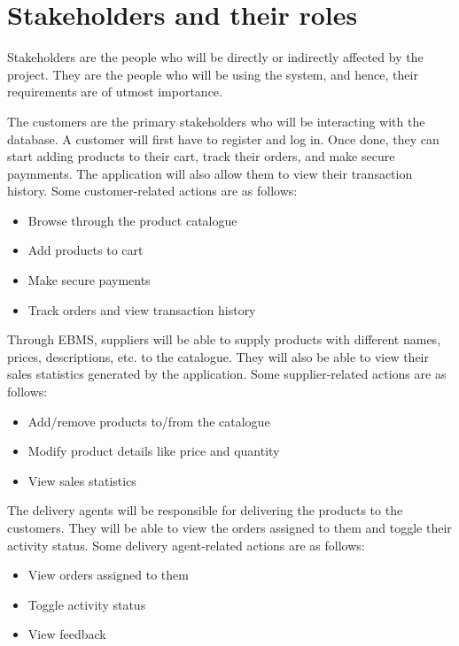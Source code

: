 \section{Stakeholders and their roles}

Stakeholders are the people who will be directly or indirectly affected by the project.
They are the people who will be using the system, and hence, their requirements are of utmost importance.

\begin{stakeholder}[Customers]
The customers are the primary stakeholders who will be interacting with the database.
A customer will first have to register and log in.
Once done, they can start adding products to their cart, track their orders, and make secure paymments.
The application will also allow them to view their transaction history.
Some customer-related actions are as follows:
\vspace*{-2pt}
\begin{itemize}
    \setlength\itemsep{0.05mm}
    \item Browse through the product catalogue
    \item Add products to cart
    \item Make secure payments
    \item Track orders and view transaction history
\end{itemize}
\end{stakeholder}
\vspace*{2pt}

\begin{stakeholder}[Suppliers]
Through EBMS, suppliers will be able to supply products with different names, prices, descriptions, etc. to the catalogue.
They will also be able to view their sales statistics generated by the application.
Some supplier-related actions are as follows:
\vspace*{-2pt}
\begin{itemize}
    \setlength\itemsep{0.05mm}
    \item Add/remove products to/from the catalogue
    \item Modify product details like price and quantity
    \item View sales statistics
\end{itemize}
\end{stakeholder}
\vspace*{2pt}

\begin{stakeholder}
The delivery agents will be responsible for delivering the products to the customers.
They will be able to view the orders assigned to them and toggle their activity status.
Some delivery agent-related actions are as follows:
\vspace*{-2pt}
\begin{itemize}
    \setlength\itemsep{0.05mm}
    \item View orders assigned to them
    \item Toggle activity status
    \item View feedback
\end{itemize}
\end{stakeholder}
\vspace*{2pt}

